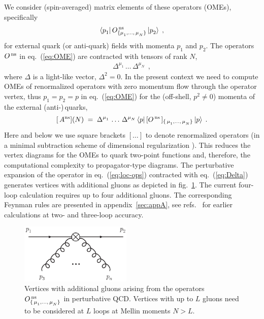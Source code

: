 \documentclass[12pt]{article}
\newcommand{\bea}{\begin{eqnarray}}
\newcommand{\eea}{\end{eqnarray}}
\begin{document}
We consider (spin-averaged) matrix elements of these operators (OMEs), 
specifically
%
\bea
\label{eq:OME}
  \langle p_1^{} \vert\, O^{\,\rm ns}_{\{\mu^{\,}_1, \ldots,\,\mu^{\,}_N\}} 
  \,\vert p_2^{} \rangle 
\:\: ,
\eea
%
for external quark (or anti-quark) fields with momenta $p_{1}^{}$ and $p_2^{}$.
The operators $O^{\,\rm ns}$ in eq.~(\ref{eq:OME}) are contracted with tensors 
of rank $N$, 
%
\begin{eqnarray}
\label{eq:Delta}
  \Delta^{\mu_1^{}}\, \dots \,\Delta^{\mu_N^{}}
\:\: ,
\end{eqnarray}
%
where $\Delta$ is a light-like vector, $\Delta^2 = 0$. 
In the present context we need to compute OMEs of renormalized operators with 
zero momentum flow through the operator vertex, thus $p_1^{}=p_2^{}=p$ in 
eq.~(\ref{eq:OME}) for the (off-shell, $p^2 \neq 0$) momenta of the external 
(anti-)$\,$quarks, 
%
\bea
\label{eq:renOME}
  [ \,A^{\rm ns}](N) \;=\;
  \Delta^{\mu_1^{}}\, \dots \,\Delta^{\mu_N^{}} \, \langle p \vert \,  
  [O^{\,\rm ns\,}]_{\{\,\mu^{\,}_1, \ldots ,\,\mu^{\,}_N\}} \,\vert p \rangle 
\:\: .
\eea
%
Here and below we use square brackets $[\dots]$ to denote renormalized 
operators (in a minimal subtraction scheme \cite{tHooft:1973mfk,Bardeen:1978yd}
of dimensional regularization \cite{Bollini:1972ui,tHooft:1972tcz}).
This reduces the vertex diagrams for the OMEs to quark two-point functions 
and, therefore, the computational complexity to propagator-type diagrams.
The perturbative expansion of the operator in eq.~(\ref{eq:loc-ops}) 
contracted with eq.~(\ref{eq:Delta}) 
generates vertices with additional gluons as depicted in fig.~\ref{fig:OMEng}.
The current four-loop calculation requires up to four additional gluons. 
The corresponding Feynman rules are presented in appendix~\ref{sec:appA}, 
see refs.~\cite{Floratos:1977au,Bierenbaum:2009mv} 
for earlier calculations at two- and three-loop accuracy.

\begin{figure}[hbt]
\begin{center}
\includegraphics[width=0.475\textwidth, angle=0]{OMEqqng.eps}
\caption{\small 
\label{fig:OMEng} 
Vertices with additional gluons arising from the operators 
$O^{\,\rm ns}_{\{\,\mu^{\,}_1,\ldots ,\,\mu^{\,}_N\}}$ in perturbative QCD.
\mbox{Vertices} with up to $L$ gluons need to be considered at $L$ loops
at Mellin moments $N > L$.
}
\end{center}
\end{figure}
\end{document}
